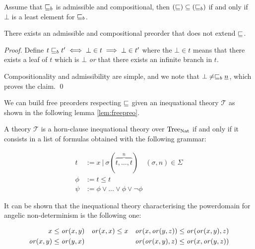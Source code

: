 \begin{lemma}
    \label{lem:coarserpreorder}
    Assume that $\sqsubseteq_b$ is admissible and compositional,
    then $(\sqsubseteq) \subseteq (\sqsubseteq_b)$ if and only if
    $\bot$ is a least element for $\sqsubseteq_b$.
\end{lemma}

    
\begin{example}
    There exists an admissible and compositional 
    preorder that does not extend $\sqsubseteq$.
\end{example}

\begin{proof}
    Define $t \sqsubseteq_b t' \iff \bot \in t \implies \bot \in t'$ where
    the $\bot \in t$ means that there exists a leaf of $t$ 
    which is $\bot$ \emph{or} that there exists an infinite branch 
    in $t$.

    Compositionality and admissibility are simple, and we note 
    that $\bot \neq \sqsubseteq_b \underline{n}$, which proves 
    the claim.
\qed\end{proof}


We can build free preorders respecting $\sqsubseteq$
given an inequational theory $\mathcal{T}$ as shown
in the following lemma \ref{lem:freepreo}.

\begin{definition}
    A theory $\mathcal{T}$ is a horn-clause inequational 
    theory over $\textnormal{Tree}_{\textnormal{Nat}}$ if and only if it consists 
    in a list of formulas obtained with the following grammar:

    \begin{align*}
        t    &:= x ~|~ \sigma (\overbrace{t,\dots,t}^n) \quad (\sigma,n) \in
        \Sigma\\
        \phi &:= t \leq t \\
        \psi &:= \phi \vee \dots \vee \phi \vee \neg \phi
    \end{align*}
\end{definition}

\begin{example}
    It can be shown that the inequational theory 
    characterising the powerdomain for angelic 
    non-determinism is the following one:

    \begin{align*}
        x \leq \operatorname{\mathit{or}} (x,y) & & \operatorname{\mathit{or}} (x,x) \leq x & & \operatorname{\mathit{or}} (x,\operatorname{\mathit{or}} (y,z))
        \leq \operatorname{\mathit{or}}(\operatorname{\mathit{or}} (x,y),z) \\
        \operatorname{\mathit{or}} (x,y) \leq \operatorname{\mathit{or}}(y,x) & & & & \operatorname{\mathit{or}}(\operatorname{\mathit{or}} (x,y),z) \leq \operatorname{\mathit{or}}
        (x,\operatorname{\mathit{or}} (y,z))
    \end{align*}
\end{example}

